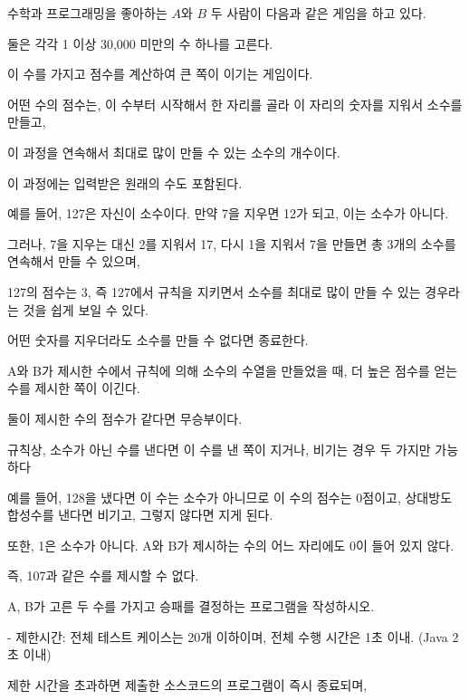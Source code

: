 \documentclass [12pt] {oblivoir}
\begin{document}
수학과 프로그래밍을 좋아하는 $A$와 $B$ 두 사람이 다음과 같은 게임을 하고 있다.

둘은 각각 1 이상 30,000 미만의 수 하나를 고른다.

이 수를 가지고 점수를 계산하여 큰 쪽이 이기는 게임이다.

어떤 수의 점수는, 이 수부터 시작해서 한 자리를 골라 이 자리의 숫자를 지워서 소수를 만들고,

이 과정을 연속해서 최대로 많이 만들 수 있는 소수의 개수이다.

이 과정에는 입력받은 원래의 수도 포함된다.

\vspace{3mm}

예를 들어, 127은 자신이 소수이다. 만약 7을 지우면 12가 되고, 이는 소수가 아니다.

그러나, 7을 지우는 대신 2를 지워서 17, 다시 1을 지워서 7을 만들면 총 3개의 소수를 연속해서 만들 수 있으며,

127의 점수는 3, 즉 127에서 규칙을 지키면서 소수를 최대로 많이 만들 수 있는 경우라는 것을 쉽게 보일 수 있다.

어떤 숫자를 지우더라도 소수를 만들 수 없다면 종료한다.

\vspace{3mm}

A와 B가 제시한 수에서 규칙에 의해 소수의 수열을 만들었을 때, 더 높은 점수를 얻는 수를 제시한 쪽이 이긴다.

둘이 제시한 수의 점수가 같다면 무승부이다.

규칙상, 소수가 아닌 수를 낸다면 이 수를 낸 쪽이 지거나, 비기는 경우 두 가지만 가능하다

\vspace{3mm}

예를 들어, 128을 냈다면 이 수는 소수가 아니므로 이 수의 점수는 0점이고, 상대방도 합성수를 낸다면 비기고, 그렇지 않다면 지게 된다.

또한, 1은 소수가 아니다. A와 B가 제시하는 수의 어느 자리에도 0이 들어 있지 않다.

즉, 107과 같은 수를 제시할 수 없다.

\vspace{3mm}

A, B가 고른 두 수를 가지고 승패를 결정하는 프로그램을 작성하시오.

\vspace{3mm}

- 제한시간: 전체 테스트 케이스는 20개 이하이며, 전체 수행 시간은 1초 이내. (Java 2초 이내)

    제한 시간을 초과하면 제출한 소스코드의 프로그램이 즉시 종료되며,
\end{document}
